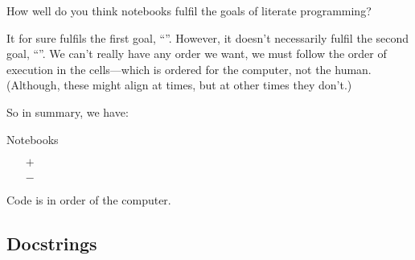 \begin{frame}
%
\begin{activity}\label{NotebooksFullfilGoals}
How well do you think notebooks fulfil the goals of literate programming?
\end{activity}
\end{frame}

It for sure fulfils the first goal, \enquote{\LPexplain}.
However, it doesn't necessarily fulfil the second goal, \enquote{\LPorder}.
We can't really have any order we want, we must follow the order of execution 
in the cells---which is ordered for the computer, not the human.
(Although, these might align at times, but at other times they don't.)

So in summary, we have:

\begin{frame}
\begin{block}{Notebooks}
  \begin{itemize}
    \item[\(+\)] {\color{green!75!black}\LPexplain}
    \item[\(-\)] {\color{red}\LPorder}
  \end{itemize}
\end{block}

\begin{remark}
  Code is in order of the computer.
\end{remark}
\end{frame}

\subsection{Docstrings}

